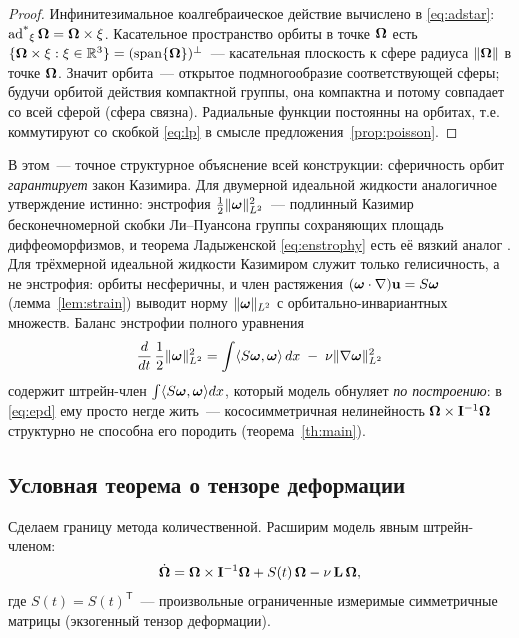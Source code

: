 \begin{proof}
Инфинитезимальное коалгебраическое действие вычислено в
\eqref{eq:adstar}: $\operatorname{ad^{*}}_{\xi}\boldsymbol{\Omega} = \boldsymbol{\Omega}\times\xi$. Касательное
пространство орбиты в точке $\boldsymbol{\Omega}$ есть
$\{\boldsymbol{\Omega}\times\xi : \xi \in \mathbb{R}^3\} = (\operatorname{span}\{\boldsymbol{\Omega}\})^{\perp}$~--- касательная плоскость к сфере радиуса $\|\boldsymbol{\Omega}\|$ в точке $\boldsymbol{\Omega}$.
Значит орбита~--- открытое подмногообразие соответствующей сферы; будучи
орбитой действия компактной группы, она компактна и потому совпадает
со всей сферой (сфера связна). Радиальные функции постоянны на орбитах,
т.е. коммутируют со скобкой \eqref{eq:lp} в смысле
предложения~\ref{prop:poisson}.
\end{proof}

В этом~--- точное структурное объяснение всей конструкции: сферичность
орбит \emph{гарантирует} закон Казимира. Для двумерной идеальной
жидкости аналогичное утверждение истинно: энстрофия
$\tfrac12\|\boldsymbol{\omega}\|_{L^2}^2$~--- подлинный Казимир бесконечномерной
скобки Ли--Пуансона группы сохраняющих площадь диффеоморфизмов, и
теорема Ладыженской \eqref{eq:enstrophy} есть её вязкий аналог
\cite{arnoldkhesin,ladyzh}. Для трёхмерной идеальной жидкости Казимиром
служит только гелисичность, а не энстрофия: орбиты несферичны, и член
растяжения $(\boldsymbol{\omega}\cdot\nabla)\mathbf{u} = S\boldsymbol{\omega}$ (лемма~\ref{lem:strain})
выводит норму $\|\boldsymbol{\omega}\|_{L^2}$ с орбитально-инвариантных множеств.
Баланс энстрофии полного уравнения
\begin{equation}\label{eq:full-enstrophy}
  \frac{d}{dt}\,\frac12\|\boldsymbol{\omega}\|_{L^2}^2
  = \int \langle S\boldsymbol{\omega}, \boldsymbol{\omega}\rangle\,dx \;-\; \nu\|\nabla\boldsymbol{\omega}\|_{L^2}^2
\end{equation}
содержит штрейн-член $\int\langle S\boldsymbol{\omega},\boldsymbol{\omega}\rangle dx$, который модель
обнуляет \emph{по построению}: в \eqref{eq:epd} ему просто негде жить~---
кососимметричная нелинейность $\boldsymbol{\Omega}\times\mathbf{I}^{-1}\boldsymbol{\Omega}$ структурно
не способна его породить (теорема~\ref{th:main}).

\subsection{Условная теорема о тензоре деформации}

Сделаем границу метода количественной. Расширим модель явным
штрейн-членом:
\begin{equation}\label{eq:epd-strain}
  \dot{\boldsymbol{\Omega}} = \boldsymbol{\Omega}\times\mathbf{I}^{-1}\boldsymbol{\Omega} + S(t)\,\boldsymbol{\Omega} - \nu\,\mathbf{L}\,\boldsymbol{\Omega},
\end{equation}
где $S(t) = S(t)^{\mathsf T}$~--- произвольные ограниченные измеримые
симметричные матрицы (экзогенный тензор деформации).

